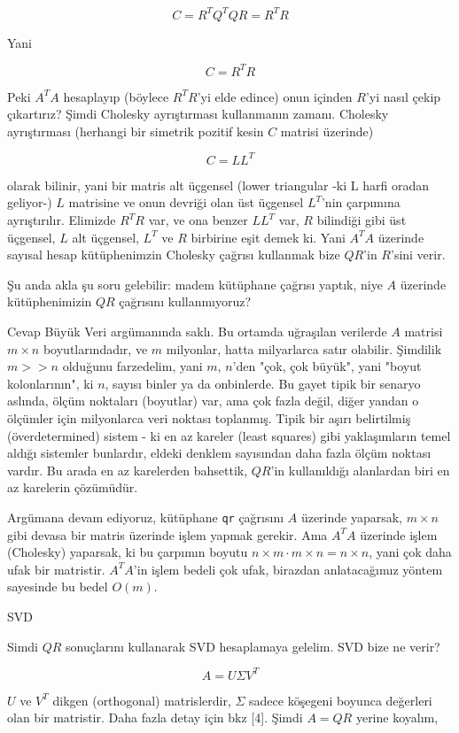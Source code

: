 \documentclass[12pt,fleqn]{article}\usepackage{../../common}
\begin{document}
$$
C = R^T Q^T QR = R^T R
$$

Yani

$$
C = R^TR
$$

Peki $A^TA$ hesaplayıp (böylece $R^TR$'yi elde edince) onun içinden $R$'yi nasıl
çekip çıkartırız? Şimdi Cholesky ayrıştırması kullanmanın zamanı. Cholesky
ayrıştırması (herhangi bir simetrik pozitif kesin $C$ matrisi üzerinde)

$$C = LL^T$$

olarak bilinir, yani bir matris alt üçgensel (lower triangular -ki L harfi
oradan geliyor-) $L$ matrisine ve onun devriği olan üst üçgensel $L^T$'nin
çarpımına ayrıştırılır. Elimizde $R^TR$ var, ve ona benzer $LL^T$ var, $R$
bilindiği gibi üst üçgensel, $L$ alt üçgensel, $L^T$ ve $R$ birbirine eşit demek
ki. Yani $A^TA$ üzerinde sayısal hesap kütüphenimzin Cholesky çağrısı kullanmak
bize $QR$'in $R$'sini verir.

Şu anda akla şu soru gelebilir: madem kütüphane çağrısı yaptık, niye $A$
üzerinde kütüphenimizin $QR$ çağrısını kullanmıyoruz?

Cevap Büyük Veri argümanında saklı. Bu ortamda uğraşılan verilerde $A$ matrisi
$m \times n$ boyutlarındadır, ve $m$ milyonlar, hatta milyarlarca satır
olabilir. Şimdilik $m >> n$ olduğunu farzedelim, yani $m$, $n$'den "çok, çok
büyük", yani "boyut kolonlarının", ki $n$, sayısı binler ya da onbinlerde. Bu
gayet tipik bir senaryo aslında, ölçüm noktaları (boyutlar) var, ama çok fazla
değil, diğer yandan o ölçümler için milyonlarca veri noktası toplanmış. Tipik
bir aşırı belirtilmiş (överdetermined) sistem - ki en az kareler (least squares)
gibi yaklaşımların temel aldığı sistemler bunlardır, eldeki denklem sayısından
daha fazla ölçüm noktası vardır. Bu arada en az karelerden bahsettik, $QR$'in
kullanıldığı alanlardan biri en az karelerin çözümüdür.

Argümana devam ediyoruz, kütüphane \verb!qr! çağrısını $A$ üzerinde yaparsak, $m
\times n$ gibi devasa bir matris üzerinde işlem yapmak gerekir. Ama $A^TA$
üzerinde işlem (Cholesky) yaparsak, ki bu çarpımın boyutu $n \times m \cdot m
\times n = n \times n$, yani çok daha ufak bir matristir. $A^TA$'in işlem bedeli
çok ufak, birazdan anlatacağımız yöntem sayesinde bu bedel $O(m)$.

SVD

Simdi $QR$ sonuçlarını kullanarak SVD hesaplamaya gelelim. SVD bize ne verir?

$$ A = U \Sigma V^T $$

$U$ ve $V^T$ dikgen (orthogonal) matrislerdir, $\Sigma$ sadece köşegeni
boyunca değerleri olan bir matristir. Daha fazla detay için bkz [4]. Şimdi
$A = QR$ yerine koyalım,
\end{document}
